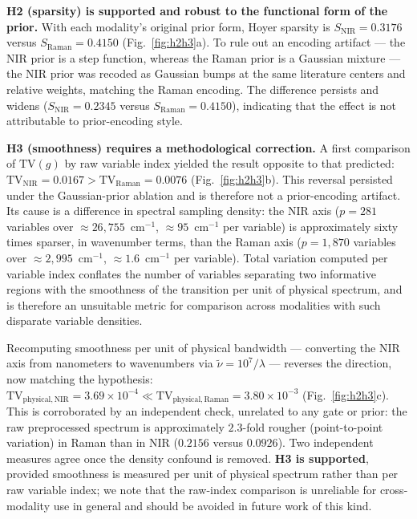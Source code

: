 \documentclass[preprint,12pt]{elsarticle}
\begin{document}
\textbf{H2 (sparsity) is supported and robust to the functional form of the prior.} With each modality's original prior form, Hoyer sparsity is $S_{\mathrm{NIR}}=0.3176$ versus $S_{\mathrm{Raman}}=0.4150$ (Fig.~\ref{fig:h2h3}a). To rule out an encoding artifact --- the NIR prior is a step function, whereas the Raman prior is a Gaussian mixture --- the NIR prior was recoded as Gaussian bumps at the same literature centers and relative weights, matching the Raman encoding. The difference persists and widens ($S_{\mathrm{NIR}}=0.2345$ versus $S_{\mathrm{Raman}}=0.4150$), indicating that the effect is not attributable to prior-encoding style.

\textbf{H3 (smoothness) requires a methodological correction.} A first comparison of $\mathrm{TV}(g)$ by raw variable index yielded the result opposite to that predicted: $\mathrm{TV}_{\mathrm{NIR}}=0.0167 > \mathrm{TV}_{\mathrm{Raman}}=0.0076$ (Fig.~\ref{fig:h2h3}b). This reversal persisted under the Gaussian-prior ablation and is therefore not a prior-encoding artifact. Its cause is a difference in spectral sampling density: the NIR axis ($p=281$ variables over $\approx26{,}755$~cm$^{-1}$, $\approx95$~cm$^{-1}$ per variable) is approximately sixty times sparser, in wavenumber terms, than the Raman axis ($p=1{,}870$ variables over $\approx2{,}995$~cm$^{-1}$, $\approx1.6$~cm$^{-1}$ per variable). Total variation computed per variable index conflates the number of variables separating two informative regions with the smoothness of the transition per unit of physical spectrum, and is therefore an unsuitable metric for comparison across modalities with such disparate variable densities.

Recomputing smoothness per unit of physical bandwidth --- converting the NIR axis from nanometers to wavenumbers via $\tilde\nu=10^{7}/\lambda$ --- reverses the direction, now matching the hypothesis: $\mathrm{TV}_{\mathrm{physical,NIR}}=3.69\times10^{-4} \ll \mathrm{TV}_{\mathrm{physical,Raman}}=3.80\times10^{-3}$ (Fig.~\ref{fig:h2h3}c). This is corroborated by an independent check, unrelated to any gate or prior: the raw preprocessed spectrum is approximately $2.3$-fold rougher (point-to-point variation) in Raman than in NIR ($0.2156$ versus $0.0926$). Two independent measures agree once the density confound is removed. \textbf{H3 is supported}, provided smoothness is measured per unit of physical spectrum rather than per raw variable index; we note that the raw-index comparison is unreliable for cross-modality use in general and should be avoided in future work of this kind.
\end{document}
